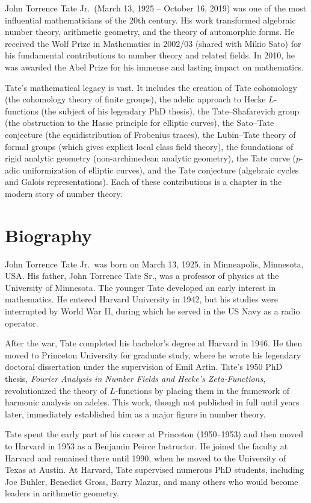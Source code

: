 John Torrence Tate Jr.\ (March 13, 1925 -- October 16, 2019) was one of the most influential mathematicians of the 20th century. His work transformed algebraic number theory, arithmetic geometry, and the theory of automorphic forms. He received the Wolf Prize in Mathematics in 2002/03 (shared with Mikio Sato) for his fundamental contributions to number theory and related fields. In 2010, he was awarded the Abel Prize for his immense and lasting impact on mathematics.

Tate's mathematical legacy is vast. It includes the creation of Tate cohomology (the cohomology theory of finite groups), the adelic approach to Hecke \(L\)-functions (the subject of his legendary PhD thesis), the Tate--Shafarevich group (the obstruction to the Hasse principle for elliptic curves), the Sato--Tate conjecture (the equidistribution of Frobenius traces), the Lubin--Tate theory of formal groups (which gives explicit local class field theory), the foundations of rigid analytic geometry (non-archimedean analytic geometry), the Tate curve (\(p\)-adic uniformization of elliptic curves), and the Tate conjecture (algebraic cycles and Galois representations). Each of these contributions is a chapter in the modern story of number theory.

\section{Biography}

John Torrence Tate Jr.\ was born on March 13, 1925, in Minneapolis, Minnesota, USA. His father, John Torrence Tate Sr., was a professor of physics at the University of Minnesota. The younger Tate developed an early interest in mathematics. He entered Harvard University in 1942, but his studies were interrupted by World War II, during which he served in the US Navy as a radio operator.

After the war, Tate completed his bachelor's degree at Harvard in 1946. He then moved to Princeton University for graduate study, where he wrote his legendary doctoral dissertation under the supervision of Emil Artin. Tate's 1950 PhD thesis, \textit{Fourier Analysis in Number Fields and Hecke's Zeta-Functions}, revolutionized the theory of \(L\)-functions by placing them in the framework of harmonic analysis on adeles. This work, though not published in full until years later, immediately established him as a major figure in number theory.

Tate spent the early part of his career at Princeton (1950--1953) and then moved to Harvard in 1953 as a Benjamin Peirce Instructor. He joined the faculty at Harvard and remained there until 1990, when he moved to the University of Texas at Austin. At Harvard, Tate supervised numerous PhD students, including Joe Buhler, Benedict Gross, Barry Mazur, and many others who would become leaders in arithmetic geometry.

